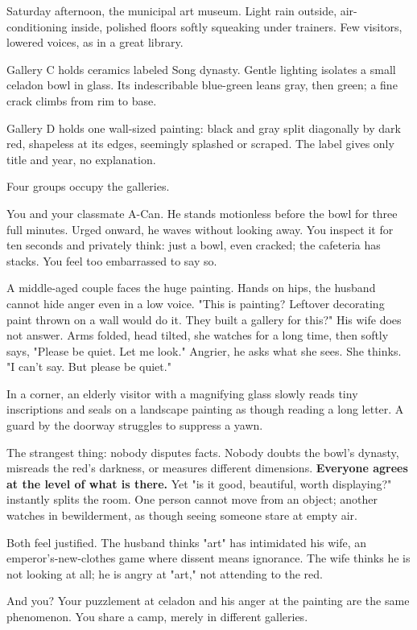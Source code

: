 Saturday afternoon, the municipal art museum. Light rain outside, air-conditioning inside, polished floors softly squeaking under trainers. Few visitors, lowered voices, as in a great library.

Gallery C holds ceramics labeled Song dynasty. Gentle lighting isolates a small celadon bowl in glass. Its indescribable blue-green leans gray, then green; a fine crack climbs from rim to base.

Gallery D holds one wall-sized painting: black and gray split diagonally by dark red, shapeless at its edges, seemingly splashed or scraped. The label gives only title and year, no explanation.

Four groups occupy the galleries.

You and your classmate A-Can. He stands motionless before the bowl for three full minutes. Urged onward, he waves without looking away. You inspect it for ten seconds and privately think: just a bowl, even cracked; the cafeteria has stacks. You feel too embarrassed to say so.

A middle-aged couple faces the huge painting. Hands on hips, the husband cannot hide anger even in a low voice. "This is painting? Leftover decorating paint thrown on a wall would do it. They built a gallery for this?" His wife does not answer. Arms folded, head tilted, she watches for a long time, then softly says, "Please be quiet. Let me look." Angrier, he asks what she sees. She thinks. "I can't say. But please be quiet."

In a corner, an elderly visitor with a magnifying glass slowly reads tiny inscriptions and seals on a landscape painting as though reading a long letter. A guard by the doorway struggles to suppress a yawn.

The strangest thing: nobody disputes facts. Nobody doubts the bowl's dynasty, misreads the red's darkness, or measures different dimensions. \textbf{Everyone agrees at the level of what is there.} Yet "is it good, beautiful, worth displaying?" instantly splits the room. One person cannot move from an object; another watches in bewilderment, as though seeing someone stare at empty air.

Both feel justified. The husband thinks "art" has intimidated his wife, an emperor's-new-clothes game where dissent means ignorance. The wife thinks he is not looking at all; he is angry at "art," not attending to the red.

And you? Your puzzlement at celadon and his anger at the painting are the same phenomenon. You share a camp, merely in different galleries.

